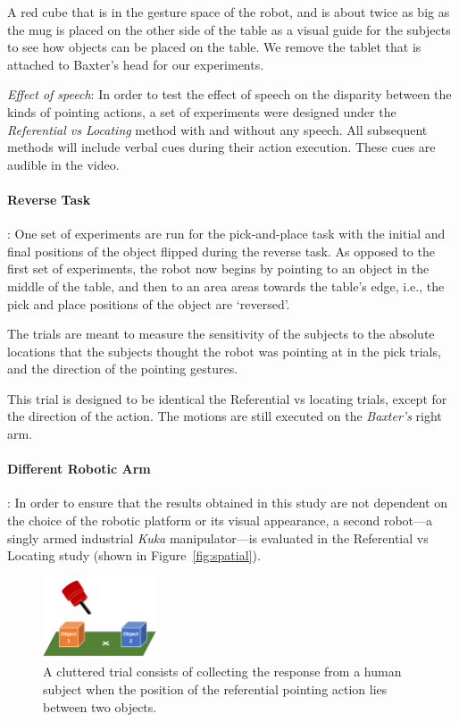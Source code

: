 A red cube that is in the gesture space of the robot, and is about twice as big as the mug is placed on the other side of the table as a visual guide for the subjects to see how objects can be placed on the table. We remove the tablet that is attached to Baxter's head for our experiments. 

\noindent\textit{Effect of speech}: In order to test the effect of speech on the disparity between the kinds of pointing actions, a set of experiments were designed under the \textit{Referential vs Locating} method with and without any speech. All subsequent methods will include verbal cues during their action execution. These cues are audible in the video.

\paragraph{Reverse Task}: One set of experiments are run for the pick-and-place task with the initial and final positions of the object flipped during the reverse task. As opposed to the first set of experiments, the robot now begins by pointing to an object in the middle of the table, and then to an area areas towards the table's edge, i.e., the pick and place positions of the object are `reversed'. 

The trials are meant to measure the sensitivity of the subjects to the absolute locations that the subjects thought the robot was pointing at in the pick trials, and the direction of the pointing gestures.


This trial is designed to be identical the Referential vs locating trials, except for the direction of the action. The motions are still executed on the \textit{Baxter's} right arm. 

\paragraph{Different Robotic Arm}:
In order to ensure that the results obtained in this study are not dependent on the choice of the robotic platform or its visual appearance, a second robot---a singly armed industrial \textit{Kuka} manipulator---is evaluated in the Referential vs Locating study (shown in Figure~\ref{fig:spatial}).

\begin{figure}[t]
    \centering
    \includegraphics[width=0.3\textwidth]{figures/clutter_trial.png}
    \caption{A cluttered trial consists of collecting the response from a human subject when the position of the referential pointing action lies between two objects.}
    \label{fig:cluttered_trial}
\end{figure}

